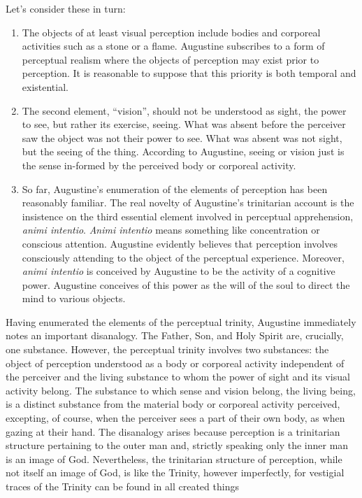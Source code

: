 \documentclass[12pt]{article}
\begin{document}
Let's consider these in turn:
\begin{enumerate}[(1)]
	\item The objects of at least visual perception include bodies and corporeal activities such as a stone or a flame. Augustine subscribes to a form of perceptual realism where the objects of perception may exist prior to perception. It is reasonable to suppose that this priority is both temporal and existential.
	\item The second element, ``vision'', should not be understood as sight, the power to see, but rather its exercise, seeing. What was absent before the perceiver saw the object was not their power to see. What was absent was not sight, but the seeing of the thing. According to Augustine, seeing or vision just is the sense in-formed by the perceived body or corporeal activity.
	\item So far, Augustine's enumeration of the elements of perception has been reasonably familiar. The real novelty of Augustine's trinitarian account is the insistence on the third essential element involved in perceptual apprehension, \emph{animi intentio}. \emph{Animi intentio} means something like concentration or conscious attention. Augustine evidently believes that perception involves consciously attending to the object of the perceptual experience. Moreover, \emph{animi intentio} is conceived by Augustine to be the activity of a cognitive power. Augustine conceives of this power as the will of the soul to direct the mind to various objects.
\end{enumerate}


Having enumerated the elements of the perceptual trinity, Augustine immediately notes an important disanalogy. The Father, Son, and Holy Spirit are, crucially, one substance. However, the perceptual trinity involves two substances: the object of perception understood as a body or corporeal activity independent of the perceiver and the living substance to whom the power of sight and its visual activity belong. The substance to which sense and vision belong, the living being, is a distinct substance from the material body or corporeal activity perceived, excepting, of course, when the perceiver sees a part of their own body, as when gazing at their hand. The disanalogy arises because perception is a trinitarian structure pertaining to the outer man and, strictly speaking only the inner man is an image of God. Nevertheless, the trinitarian structure of perception, while not itself an image of God, is like the Trinity, however imperfectly, for vestigial traces of the Trinity can be found in all created things
\end{document}
